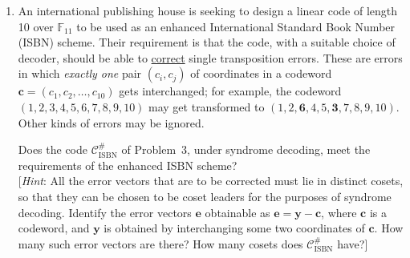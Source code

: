 \documentclass[11pt,a4paper]{article}
\def\c{\mathbf{c}}
\def\e{\mathbf{e}}
\def\y{\mathbf{y}}
\def\F{{\mathbb F}}
\def\cC{\mathcal{C}}
\begin{document}
\begin{enumerate}
\item
An international publishing house is seeking to design a linear code of length 10 over $\F_{11}$ to be used as an 
enhanced International Standard Book Number (ISBN) scheme. 
Their requirement is that the code, with a suitable choice of decoder,
should be able to \underline{correct} single transposition errors.
These are errors in which \emph{exactly one} pair $(c_i,c_j)$ of coordinates
in a codeword $\c = (c_1,c_2,\ldots,c_{10})$ gets interchanged; for example,
the codeword $(1,2,3,4,5,6,7,8,9,10)$ may get transformed to 
$(1,2,\mathbf{6},4,5,\mathbf{3},7,8,9,10)$. Other kinds of errors may be ignored.

Does the code $\cC_\text{ISBN}^{\#}$ of Problem~3, under syndrome decoding, meet the requirements of the enhanced ISBN scheme? \\[0pt]
[\emph{Hint\/}: All the error vectors that are to be corrected must lie in distinct cosets, so that they can be chosen to be coset leaders for the purposes of syndrome decoding. Identify the error vectors $\e$ obtainable as $\e = \y-\c$, where $\c$ is a codeword,
and $\y$ is obtained by interchanging some two coordinates of $\c$. How many such error vectors are there? How many cosets does $\cC_\text{ISBN}^{\#}$ have?]

\end{enumerate}
\end{document}
